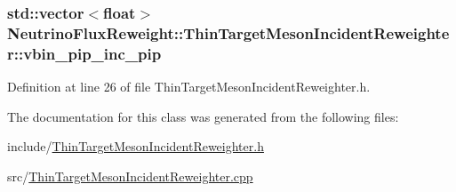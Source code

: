 \hypertarget{class_neutrino_flux_reweight_1_1_thin_target_meson_incident_reweighter_afb51aec44c86299cc25d2b67936fdaa0}{
\subsubsection[{vbin\-\_\-pip\-\_\-inc\-\_\-pip}]{\setlength{\rightskip}{0pt plus 5cm}std\-::vector$<$float$>$ Neutrino\-Flux\-Reweight\-::\-Thin\-Target\-Meson\-Incident\-Reweighter\-::vbin\-\_\-pip\-\_\-inc\-\_\-pip}}\label{class_neutrino_flux_reweight_1_1_thin_target_meson_incident_reweighter_afb51aec44c86299cc25d2b67936fdaa0}


Definition at line 26 of file Thin\-Target\-Meson\-Incident\-Reweighter.\-h.



The documentation for this class was generated from the following files\-:\begin{DoxyCompactItemize}
\item 
include/\hyperlink{_thin_target_meson_incident_reweighter_8h}{Thin\-Target\-Meson\-Incident\-Reweighter.\-h}\item 
src/\hyperlink{_thin_target_meson_incident_reweighter_8cpp}{Thin\-Target\-Meson\-Incident\-Reweighter.\-cpp}\end{DoxyCompactItemize}
